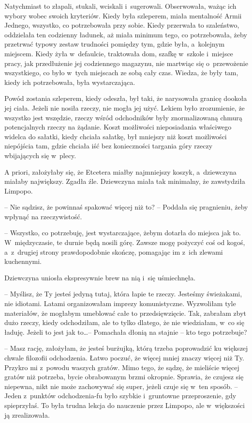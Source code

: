 \documentclass[oneside,polish,11pt,sfheadings]{mwbk}
\begin{document}
Natychmiast to złapali, stukali, wciskali i~sugerowali. Obserwowała,
ważąc ich wybory wobec swoich kryteriów. Kiedy była szleperem, miała
mentalność Armii Jednego, wszystko, co potrzebowała przy sobie. Kiedy
przerwała to szaleństwo, oddzielała ten codzienny ładunek, aż miała
minimum tego, co potrzebowała, żeby przetrwać typowy zestaw trudności
pomiędzy tym, gdzie była, a~kolejnym miejscem. Kiedy żyła w~defaulcie,
traktowała dom, szafkę w~szkole i~miejsce pracy, jak przedłużenie jej
codziennego magazynu, nie martwiąc się o~przewożenie wszystkiego, co
było w~tych miejscach ze sobą cały czas. Wiedza, że były tam, kiedy ich
potrzebowała, była wystarczająca.

Powód zostania szleperem, kiedy odeszła, był taki, że narysowała granicę
dookoła jej ciała. Jeżeli nie nosiła rzeczy, nie mogła jej użyć. Lekiem
było zrozumienie, że wszystko jest wszędzie, rzeczy wśród odchodników
były znormalizowaną chmurą potencjalnych rzeczy na żądanie. Koszt
możliwości nieposiadania właściwego widelca do sałatki, kiedy chciała
sałatkę, był mniejszy niż koszt możliwości niepójścia tam, gdzie chciała
iść bez konieczności targania góry rzeczy wbijających się w~plecy.

A priori, założyłaby się, że Etcetera miałby najmniejszy koszyk, a~dziewczyna miałaby największy. Zgadła źle. Dziewczyna miała tak
minimalny, że zawstydziła Limpopo.

-- Nie sądzisz, że powinnaś spakować więcej niż to? -- Poddała się
pragnieniu, żeby wpłynąć na rzeczywistość.

-- Wszystko, co potrzebuję, jest wystarczające, żebym dotarła do miejsca
jak to. W~międzyczasie, te durnie będą nosili górę. Zawsze mogę pożyczyć
coś od kogoś, a~z~drugiej strony prawdopodobnie skończę, pomagając im z~ich zlewami kuchennymi.

Dziewczyna uniosła ekspresywnie brew na nią i~się uśmiechnęła. 

-- Myślisz, że Ty jesteś jedyną tutaj, która łapie te rzeczy. Jesteśmy
świeżakami, nie idiotami. Latami organizowałam imprezy komunistyczne.
Wyzwoliłam tyle materiałów, że mogłabym umeblować całe to
przedsięwzięcie. Tak, zabrałam zbyt dużo rzeczy, kiedy odchodziłam, ale
to tylko dlatego, że nie wiedziałam, w~co się ładuję. Jeżeli to jest jak
to\ldots  -- Pomachała dłonią na stajnie -- kto tego potrzebuje?

-- Masz rację, założyłam, że jesteś burżujką, którą trzeba poprowadzić ku
większej chwale filozofii odchodzenia. Łatwo poczuć, że więcej mniej
znaczy więcej niż Ty. Przykro mi z~powodu waszych gratów. Mimo tego, że
sądzę, że mieliście więcej gratów niż potrzeba, bycie obrabowanym brzmi
okropnie. Sprawia, że czujesz się niepewna, nikt nie może zachowywać się
super, jeżeli czuje się w~ten sposób. -- Jeden z~punktów odchodzenia-fu
było szybkie i~gruntowne przeproszenie, gdy spieprzyłaś. To była trudna
lekcja do nauczenie przez Limpopo, ale w~większości ją zrealizowała.
\end{document}
